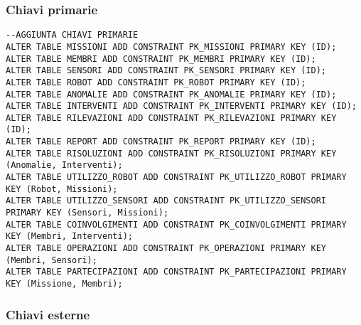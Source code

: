 \documentclass{article}
\begin{document}
\subsubsection{Chiavi primarie}

\begin{verbatim}
--AGGIUNTA CHIAVI PRIMARIE
ALTER TABLE MISSIONI ADD CONSTRAINT PK_MISSIONI PRIMARY KEY (ID);
ALTER TABLE MEMBRI ADD CONSTRAINT PK_MEMBRI PRIMARY KEY (ID);
ALTER TABLE SENSORI ADD CONSTRAINT PK_SENSORI PRIMARY KEY (ID);
ALTER TABLE ROBOT ADD CONSTRAINT PK_ROBOT PRIMARY KEY (ID);
ALTER TABLE ANOMALIE ADD CONSTRAINT PK_ANOMALIE PRIMARY KEY (ID);
ALTER TABLE INTERVENTI ADD CONSTRAINT PK_INTERVENTI PRIMARY KEY (ID);
ALTER TABLE RILEVAZIONI ADD CONSTRAINT PK_RILEVAZIONI PRIMARY KEY (ID);
ALTER TABLE REPORT ADD CONSTRAINT PK_REPORT PRIMARY KEY (ID);
ALTER TABLE RISOLUZIONI ADD CONSTRAINT PK_RISOLUZIONI PRIMARY KEY (Anomalie, Interventi);
ALTER TABLE UTILIZZO_ROBOT ADD CONSTRAINT PK_UTILIZZO_ROBOT PRIMARY KEY (Robot, Missioni);
ALTER TABLE UTILIZZO_SENSORI ADD CONSTRAINT PK_UTILIZZO_SENSORI PRIMARY KEY (Sensori, Missioni);
ALTER TABLE COINVOLGIMENTI ADD CONSTRAINT PK_COINVOLGIMENTI PRIMARY KEY (Membri, Interventi);
ALTER TABLE OPERAZIONI ADD CONSTRAINT PK_OPERAZIONI PRIMARY KEY (Membri, Sensori);
ALTER TABLE PARTECIPAZIONI ADD CONSTRAINT PK_PARTECIPAZIONI PRIMARY KEY (Missione, Membri);
\end{verbatim}

\subsubsection{Chiavi esterne}
\end{document}
